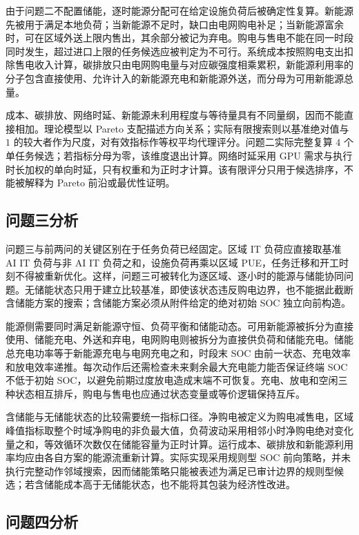 \documentclass[withoutpreface,bwprint]{cumcmthesis}
\begin{document}
由于问题二不配置储能，逐时能源分配可在给定设施负荷后被确定性复算。新能源先被用于满足本地负荷；当新能源不足时，缺口由电网购电补足；当新能源富余时，可在区域外送上限内售出，其余部分被记为弃电。购电与售电不能在同一时段同时发生，超过进口上限的任务候选应被判定为不可行。系统成本按照购电支出扣除售电收入计算，碳排放只由电网购电量与对应碳强度相乘累积，新能源利用率的分子包含直接使用、允许计入的新能源充电和新能源外送，而分母为可用新能源总量。

成本、碳排放、网络时延、新能源未利用程度与等待量具有不同量纲，因而不能直接相加。理论模型以 Pareto 支配描述方向关系；实际有限搜索则以基准绝对值与 $1$ 的较大者作为尺度，对有效指标作等权平均代理评分。问题二实际完整复算 $4$ 个单任务候选；若指标分母为零，该维度退出计算。网络时延采用 GPU 需求与执行时长加权的单向时延，只有权重和为正时才计算。该有限评分只用于候选排序，不能被解释为 Pareto 前沿或最优性证明。

\subsection{问题三分析}

问题三与前两问的关键区别在于任务负荷已经固定。区域 IT 负荷应直接取基准 AI IT 负荷与非 AI IT 负荷之和，设施负荷再乘以区域 PUE，任务迁移和开工时刻不得被重新优化。这样，问题三可被转化为逐区域、逐小时的能源与储能协同问题。无储能状态只用于建立比较基准，即使该状态违反购电边界，也不能据此截断含储能方案的搜索；含储能方案必须从附件给定的绝对初始 SOC 独立向前构造。

能源侧需要同时满足新能源守恒、负荷平衡和储能动态。可用新能源被拆分为直接使用、储能充电、外送和弃电，电网购电则被拆分为直接供负荷和储能充电。储能总充电功率等于新能源充电与电网充电之和，时段末 SOC 由前一状态、充电效率和放电效率递推。每次动作后还需检查未来剩余最大充电能力能否保证终端 SOC 不低于初始 SOC，以避免前期过度放电造成末端不可恢复。充电、放电和空闲三种状态相互排斥，购电与售电也应通过状态变量或等价逻辑保持互斥。

含储能与无储能状态的比较需要统一指标口径。净购电被定义为购电减售电，区域峰值指标取整个时域净购电的非负最大值，负荷波动采用相邻小时净购电绝对变化量之和，等效循环次数仅在储能容量为正时计算。运行成本、碳排放和新能源利用率均应由各自方案的能源流重新计算。实际实现采用规则型 SOC 前向策略，并未执行完整动作邻域搜索，因而储能策略只能被表述为满足已审计边界的规则型候选；若含储能成本高于无储能状态，也不能将其包装为经济性改进。

\subsection{问题四分析}
\end{document}
